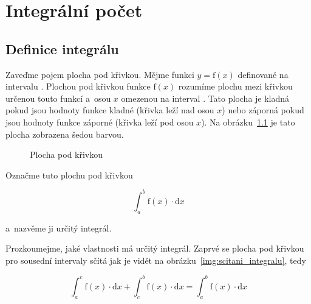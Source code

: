 \chapter{Integrální počet}

\section{Definice integrálu}

Zaveďme pojem plocha pod křivkou. Mějme funkci \(y = \mathrm{f}(x)\) definované na intervalu \(<a, b>\). Plochou pod křivkou funkce \(\mathrm{f}(x)\) rozumíme plochu mezi křivkou určenou touto funkcí a~osou \(x\) omezenou na interval \(<a, b>\). Tato plocha je kladná pokud jsou hodnoty funkce kladné (křivka leží nad osou \(x\)) nebo záporná pokud jsou hodnoty funkce záporné (křivka leží pod osou \(x\)).
Na obrázku~\ref{img:plocha_pod_krivkou} je tato plocha zobrazena šedou barvou.

\begin{figure}[ht]
\begin{center}
\caption{Plocha pod křivkou}
\end{center}
\label{img:plocha_pod_krivkou}
\end{figure}

Označme tuto plochu pod křivkou

\begin{equation}
\int_{a}^{b} \mathrm{f}(x) \cdot \mathrm{d}x
\end{equation}

a~nazvěme ji určitý integrál.

Prozkoumejme, jaké vlastnosti má určitý integrál. Zaprvé se plocha pod křivkou pro sousední intervaly sčítá jak je vidět na obrázku~\ref{img:scitani_integralu}, tedy

\begin{equation}
\label{eq:scitani_integralu}
\int_{a}^{c} \mathrm{f}(x) \cdot \mathrm{d}x + \int_{c}^{b} \mathrm{f}(x) \cdot \mathrm{d}x = \int_{a}^{b} \mathrm{f}(x) \cdot \mathrm{d}x
\end{equation}


